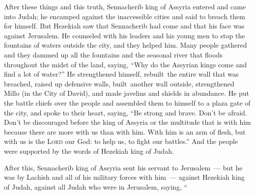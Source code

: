 
\begin{inparaenum}
     After these things and this truth, Sennacherib king of Assyria entered and came into Judah; he encamped against the inaccessible cities and said to breach them for himself.%
     But Hezekiah saw that Sennacherib had come and that his face was against Jerusalem.%
     He counseled with his leaders and his young men to stop the fountains of waters outside the city, and they helped him.%
     Many people gathered and they dammed up all the fountains and the seasonal river that floods throughout the midst of the land, saying, ``Why do the Assyrian kings come and find a lot of water?''%
     He strengthened himself, rebuilt\thinspace\understood\ the entire wall that was breached, raised up defensive walls, built\understood\ another wall outside, strengthened Millo (in the City of David), and made javelins and shields in abundance.%
     He put the battle chiefs over the people and assembled them to himself to a plaza gate of the city, and spoke to their heart, saying,%
     ``Be strong and brave. Don't be afraid. Don't be discouraged before the king of Assyria or the multitude that is with him because there are more with us than with him.%
     With him is an arm of flesh, but with us is the \textsc{Lord} our God: to help us, to fight our battles.'' And the people were supported by the words of Hezekiah king of Judah.%
    
     After this, Sennacherib king of Assyria sent his servant to Jerusalem~--- but he was by Lachish and all of his military forces with him~--- against Hezekiah king of Judah, against all Judah who were in Jerusalem, saying,%
     ``%
    
    
    
\end{inparaenum}
